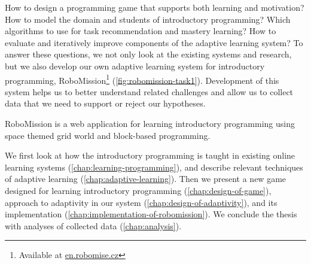 
How to design a programming game that supports both learning and motivation?
How to model the domain and students of introductory programming?
Which algorithms to use for task recommendation and mastery learning?
How to evaluate and iteratively improve components of the adaptive learning system?
To answer these questions, we not only look at the existing systems
and research, but we also develop our own adaptive learning system for
introductory programming, RoboMission\footnote{Available at \url{en.robomise.cz}}
(\cref{fig:robomission-task1}).
Development of this system helps us to better understand related challenges
and allow us to collect data that we need to support or reject our hypotheses.

%
  {RoboMission is a web application for learning introductory programming %
   using space themed grid world and block-based programming.}

We first look at how the introductory programming is taught
in existing online learning systems
(\cref{chap:learning-programming}),
and describe relevant techniques of adaptive learning
(\cref{chap:adaptive-learning}).
Then we present a new game designed for learning introductory programming
(\cref{chap:design-of-game}),
approach to adaptivity in our system (\cref{chap:design-of-adaptivity}),
and its implementation (\cref{chap:implementation-of-robomission}).
We conclude the thesis with analyses of collected data
(\cref{chap:analysis}).
